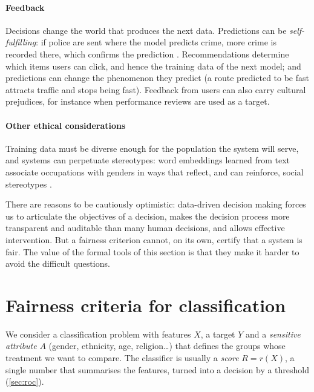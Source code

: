 \paragraph{Feedback} Decisions change the world that produces the next data. Predictions can be
\emph{self-fulfilling}: if police are sent where the model predicts crime, more crime is recorded
there, which confirms the prediction \citep{ensign2018runaway}. Recommendations determine which
items users can click, and hence the training data of the next model; and predictions can change
the phenomenon they predict (a route predicted to be fast attracts traffic and stops being fast).
Feedback from users can also carry cultural prejudices, for instance when performance reviews
are used as a target.

\paragraph{Other ethical considerations} Training data must be diverse enough for the
population the system will serve, and systems can perpetuate stereotypes: word embeddings learned
from text associate occupations with genders in ways that reflect, and can reinforce, social
stereotypes \citep{bolukbasi2016man}.

\begin{keyidea}
There are reasons to be cautiously optimistic: data-driven decision making forces us to
articulate the objectives of a decision, makes the decision process more transparent and
auditable than many human decisions, and allows effective intervention. But a fairness criterion cannot, on its own, certify that a system is fair. The value of the formal tools of this section is
that they make it harder to avoid the difficult questions.
\end{keyidea}

\section{Fairness criteria for classification}\label{sec:fairnesscriteria}

We consider a classification problem with features $X$, a target $Y$ and a \emph{sensitive
attribute} $A$ (gender, ethnicity, age, religion\dots) that defines the groups whose treatment we
want to compare. The classifier is usually a \emph{score} $R=r(X)$, a single number that
summarises the features, turned into a decision by a threshold (\cref{sec:roc}).

